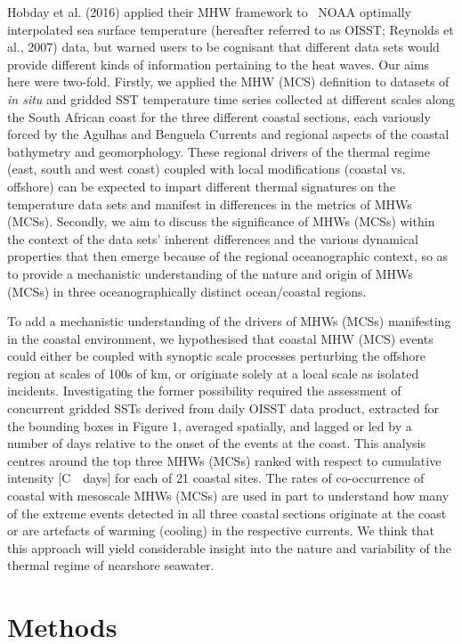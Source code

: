 \documentclass[a4paper,10pt,review]{elsarticle}
\begin{document}
Hobday et al. (2016) applied their MHW framework to \degree~NOAA optimally interpolated sea surface temperature (hereafter referred to as OISST; Reynolds et al., 2007) data, but warned users to be cognisant that different data sets would provide different kinds of information pertaining to the heat waves. Our aims here were two-fold. Firstly, we applied the MHW (MCS) definition to datasets of \emph{in situ} and gridded SST temperature time series collected at different scales along the South African coast for the three different coastal sections, each variously forced by the Agulhas and Benguela Currents and regional aspects of the coastal bathymetry and geomorphology. These regional drivers of the thermal regime (east, south and west coast) coupled with local modifications (coastal vs. offshore) can be expected to impart different thermal signatures on the temperature data sets and manifest in differences in the metrics of MHWs (MCSs). Secondly, we aim to discuss the significance of MHWs (MCSs) within the context of the data sets’ inherent differences and the various dynamical properties that then emerge because of the regional oceanographic context, so as to provide a mechanistic understanding of the nature and origin of MHWs (MCSs) in three oceanographically distinct ocean/coastal regions.

To add a mechanistic understanding of the drivers of MHWs (MCSs) manifesting in the coastal environment, we hypothesised that coastal MHW (MCS) events could either be coupled with synoptic scale processes perturbing the offshore region at scales of 100s of km, or originate solely at a local scale as isolated incidents. Investigating the former possibility required the assessment of concurrent gridded SSTs derived from daily OISST data product, extracted for the bounding boxes in Figure 1, averaged spatially, and lagged or led by a number of days relative to the onset of the events at the coast. This analysis centres around the top three MHWs (MCSs) ranked with respect to cumulative intensity [\degree C~\texttimes~days] for each of 21 coastal sites. The rates of co-occurrence of coastal with mesoscale MHWs (MCSs) are used in part to understand how many of the extreme events detected in all three coastal sections originate at the coast or are artefacts of warming (cooling) in the respective currents. We think that this approach will yield considerable insight into the nature and variability of the thermal regime of nearshore seawater.

\section{Methods}
\end{document}
